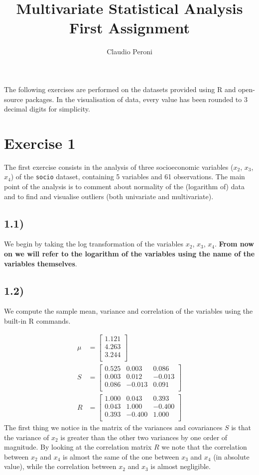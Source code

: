 \documentclass[a4paper,11pt,oneside]{report}
\title{Multivariate Statistical Analysis \\ First Assignment}
\author{Claudio Peroni}
\date{}
\begin{document}
\maketitle
The following exercises are performed on the datasets provided using R and open-source packages. In the visualisation of data, every value has been rounded to 3 decimal digits for simplicity.
\section*{Exercise 1}
The first exercise consists in the analysis of three socioeconomic variables ($x_2$, $x_3$, $x_4$) of the  \texttt{socio} dataset, containing 5 variables and 61 observations. The main point of the analysis is to comment about normality of the (logarithm of) data and to find and visualise outliers (both univariate and multivariate).
\subsection*{1.1)}
	We begin by taking the log transformation of the variables $x_2$, $x_3$, $x_4$.
	\textbf{From now on we will refer to the logarithm of the variables using the name of the variables themselves}.

\subsection*{1.2)}
	We compute the sample mean, variance and correlation of the variables using the built-in R commands.

	\begin{align}
	\mu &= 
	\begin{bmatrix}
	  1.121 \\ 
	  4.263 \\ 
	  3.244 \\ 
	   \end{bmatrix} \nonumber \\
	S &=
	\begin{bmatrix}
	  0.525 & 0.003 & 0.086 \\ 
	  0.003 & 0.012 & -0.013 \\ 
	  0.086 & -0.013 & 0.091 \\ 
	   \end{bmatrix} \nonumber \\
	R &= \begin{bmatrix}
	  1.000 & 0.043 & 0.393 \\ 
	  0.043 & 1.000 & -0.400 \\ 
	  0.393 & -0.400 & 1.000 \\ 
	   \end{bmatrix} \nonumber
	\end{align}
	The first thing we notice in the matrix of the variances and covariances $S$ is that the variance of $x_2$ is greater than the other two variances by one order of magnitude.
	By looking at the correlation matrix $R$ we note that the correlation between $x_2$ and $x_4$ is almost the same of the one between $x_3$ and $x_4$ (in absolute value), while the correlation between $x_2$ and $x_3$ is almost negligible.
\end{document}
